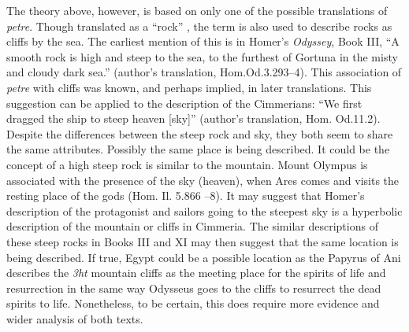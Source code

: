 	The theory above, however, is based on only one of the possible translations of \emph{petre}. Though translated as a “rock” \parencite{Liddell1940}, the term is also used to describe rocks as cliffs by the sea. The earliest mention of this is in Homer’s \emph{Odyssey}, Book III, “A smooth rock is high and steep to the sea, to the furthest of Gortuna in the misty and cloudy dark sea.” (author’s translation, Hom.Od.3.293–4). This association of \emph{petre} with cliffs was known, and perhaps implied, in later translations. This suggestion can be applied to the description of the Cimmerians: “We first dragged the ship to steep heaven [sky]” (author’s translation, Hom. Od.11.2). Despite the differences between the steep rock and sky, they both seem to share the same attributes. Possibly the same place is being described. It could be the concept of a high steep rock is similar to the mountain. Mount Olympus is associated with the presence of the sky (heaven), when Ares comes and visits the resting place of the gods (Hom. Il. 5.866 –8). It may suggest that Homer’s description of the protagonist and sailors going to the steepest sky is a hyperbolic description of the mountain or cliffs in Cimmeria. The similar descriptions of these steep rocks in Books III and XI may then suggest that the same location is being described. If true, Egypt could be a possible location as the Papyrus of Ani describes the \emph{3ht} mountain cliffs as the meeting place for the spirits of life and resurrection in the same way Odysseus goes to the cliffs to resurrect the dead spirits to life. Nonetheless, to be certain, this does require more evidence and wider analysis of both texts.
	
